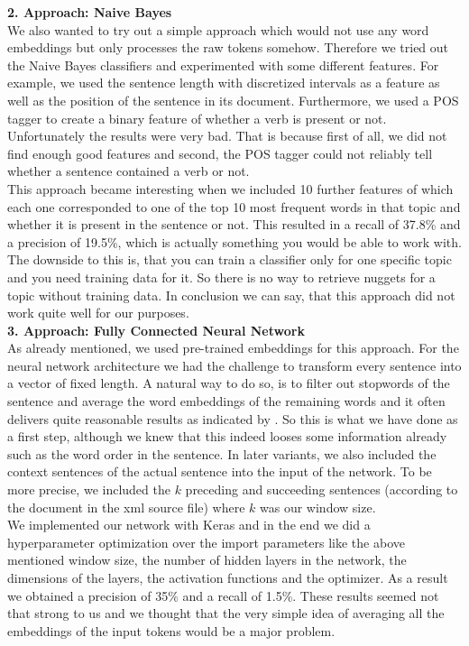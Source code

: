 \textbf{2. Approach: Naive Bayes}\\
We also wanted to try out a simple approach which would not use any word embeddings but only processes the raw tokens somehow. Therefore we tried out the Naive Bayes classifiers and experimented with some different features. For example, we used the sentence length with discretized intervals as a feature as well as the position of the sentence in its document. Furthermore, we used a POS tagger to create a binary feature of whether a verb is present or not. Unfortunately the results were very bad. That is because first of all, we did not find enough good features and second, the POS tagger could not reliably tell whether a sentence contained a verb or not.\\
This approach became interesting when we included 10 further features of which each one corresponded to one of the top 10 most frequent words in that topic and whether it is present in the sentence or not. This resulted in a recall of 37.8\% and a precision of 19.5\%, which is actually something you would be able to work with. The downside to this is, that you can train a classifier only for one specific topic and you need training data for it. So there is no way to retrieve nuggets for a topic without training data. In conclusion we can say, that this approach did not work quite well for our purposes.\\

\textbf{3. Approach: Fully Connected Neural Network}\\
As already mentioned, we used pre-trained embeddings for this approach. For the neural network architecture we had the challenge to transform every sentence into a vector of fixed length. A natural way to do so, is to filter out stopwords of the sentence and average the word embeddings of the remaining words and it often delivers quite reasonable results as indicated by \cite{iyyer2015deep}. So this is what we have done as a first step, although we knew that this indeed looses some information already such as the word order in the sentence. In later variants, we also included the context sentences of the actual sentence into the input of the network. To be more precise, we included the $k$ preceding and succeeding sentences (according to the document in the xml source file) where $k$ was our window size.\\
We implemented our network with Keras and in the end we did a hyperparameter optimization over the import parameters like the above mentioned window size, the number of hidden layers in the network, the dimensions of the layers, the activation functions and the optimizer. As a result we obtained a precision of 35\% and a recall of 1.5\%. These results seemed not that strong to us and we thought that the very simple idea of averaging all the embeddings of the input tokens would be a major problem.\\

